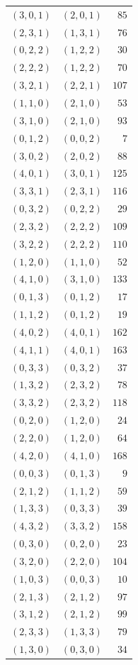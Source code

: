 \begin{longtable}{@{}rrr@{}}
$(3,0,1)$ & $(2,0,1)$ & $85$\\
$(2,3,1)$ & $(1,3,1)$ & $76$\\
$(0,2,2)$ & $(1,2,2)$ & $30$\\
$(2,2,2)$ & $(1,2,2)$ & $70$\\
$(3,2,1)$ & $(2,2,1)$ & $107$\\
$(1,1,0)$ & $(2,1,0)$ & $53$\\
$(3,1,0)$ & $(2,1,0)$ & $93$\\
$(0,1,2)$ & $(0,0,2)$ & $7$\\
$(3,0,2)$ & $(2,0,2)$ & $88$\\
$(4,0,1)$ & $(3,0,1)$ & $125$\\
$(3,3,1)$ & $(2,3,1)$ & $116$\\
$(0,3,2)$ & $(0,2,2)$ & $29$\\
$(2,3,2)$ & $(2,2,2)$ & $109$\\
$(3,2,2)$ & $(2,2,2)$ & $110$\\
$(1,2,0)$ & $(1,1,0)$ & $52$\\
$(4,1,0)$ & $(3,1,0)$ & $133$\\
$(0,1,3)$ & $(0,1,2)$ & $17$\\
$(1,1,2)$ & $(0,1,2)$ & $19$\\
$(4,0,2)$ & $(4,0,1)$ & $162$\\
$(4,1,1)$ & $(4,0,1)$ & $163$\\
$(0,3,3)$ & $(0,3,2)$ & $37$\\
$(1,3,2)$ & $(2,3,2)$ & $78$\\
$(3,3,2)$ & $(2,3,2)$ & $118$\\
$(0,2,0)$ & $(1,2,0)$ & $24$\\
$(2,2,0)$ & $(1,2,0)$ & $64$\\
$(4,2,0)$ & $(4,1,0)$ & $168$\\
$(0,0,3)$ & $(0,1,3)$ & $9$\\
$(2,1,2)$ & $(1,1,2)$ & $59$\\
$(1,3,3)$ & $(0,3,3)$ & $39$\\
$(4,3,2)$ & $(3,3,2)$ & $158$\\
$(0,3,0)$ & $(0,2,0)$ & $23$\\
$(3,2,0)$ & $(2,2,0)$ & $104$\\
$(1,0,3)$ & $(0,0,3)$ & $10$\\
$(2,1,3)$ & $(2,1,2)$ & $97$\\
$(3,1,2)$ & $(2,1,2)$ & $99$\\
$(2,3,3)$ & $(1,3,3)$ & $79$\\
$(1,3,0)$ & $(0,3,0)$ & $34$\\

\end{longtable}

